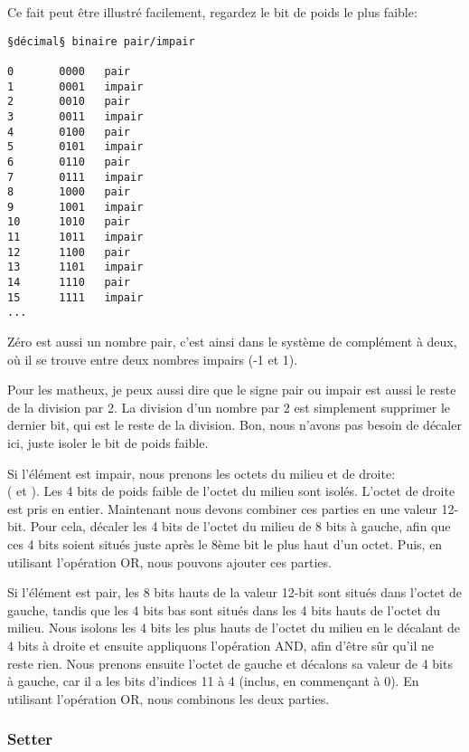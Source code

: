 Ce fait peut être illustré facilement, regardez le bit de poids le plus faible:

\begin{lstlisting}
§décimal§ binaire pair/impair

0       0000   pair
1       0001   impair
2       0010   pair
3       0011   impair
4       0100   pair
5       0101   impair
6       0110   pair
7       0111   impair
8       1000   pair
9       1001   impair
10      1010   pair
11      1011   impair
12      1100   pair
13      1101   impair
14      1110   pair
15      1111   impair
...
\end{lstlisting}

Zéro est aussi un nombre pair, c'est ainsi dans le système de complément à deux,
où il se trouve entre deux nombres impairs (-1 et 1).

Pour les matheux, je peux aussi dire que le signe pair ou impair est aussi le
reste de la division par 2.
La division d'un nombre par 2 est simplement supprimer le dernier bit, qui est le
reste de la division.
Bon, nous n'avons pas besoin de décaler ici, juste isoler le bit de poids faible.

Si l'élément est impair, nous prenons les octets du milieu et de droite:\\ (
et ).
Les 4 bits de poids faible de l'octet du milieu sont isolés.
L'octet de droite est pris en entier.
Maintenant nous devons combiner ces parties en une valeur 12-bit.
Pour cela, décaler les 4 bits de l'octet du milieu de 8 bits à gauche, afin que ces
4 bits soient situés juste après le 8ème bit le plus haut d'un octet.
Puis, en utilisant l'opération OR, nous pouvons ajouter ces parties.

Si l'élément est pair, les 8 bits hauts de la valeur 12-bit sont situés dans l'octet
de gauche, tandis que les 4 bits bas sont situés dans les 4 bits hauts de l'octet
du milieu.
Nous isolons les 4 bits les plus hauts de l'octet du milieu en le décalant de 4 bits
à droite et ensuite appliquons l'opération AND, afin d'être sûr qu'il ne reste rien.
Nous prenons ensuite l'octet de gauche et décalons sa valeur de 4 bits à gauche,
car il a les bits d'indices 11 à 4 (inclus, en commençant à 0).
En utilisant l'opération OR, nous combinons les deux parties.

\subsubsection{Setter}

